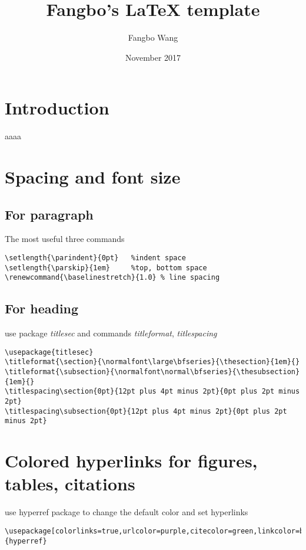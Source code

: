 \documentclass[12pt]{article}
\title{Fangbo's \LaTeX{} template}
\author{Fangbo Wang \\   }
\date{November 2017}
\renewcommand{\baselinestretch}{1.0} %
\begin{document}
\maketitle
\tableofcontents

\newpage
\section{Introduction}
aaaa
\section{Spacing and font size}

\subsection{For paragraph}
The most useful three commands
\begin{lstlisting}
\setlength{\parindent}{0pt}   %indent space
\setlength{\parskip}{1em}     %top, bottom space
\renewcommand{\baselinestretch}{1.0} % line spacing
\end{lstlisting}

\subsection{For heading}
use package \textit{titlesec} and commands \textit{titleformat}, \textit{titlespacing}
\begin{lstlisting}
\usepackage{titlesec}
\titleformat{\section}{\normalfont\large\bfseries}{\thesection}{1em}{}
\titleformat{\subsection}{\normalfont\normal\bfseries}{\thesubsection}{1em}{}
\titlespacing\section{0pt}{12pt plus 4pt minus 2pt}{0pt plus 2pt minus 2pt}
\titlespacing\subsection{0pt}{12pt plus 4pt minus 2pt}{0pt plus 2pt minus 2pt}
\end{lstlisting}


\section{Colored hyperlinks for figures, tables, citations}
use hyperref package to change the default color and set hyperlinks
\begin{lstlisting}
\usepackage[colorlinks=true,urlcolor=purple,citecolor=green,linkcolor=blue]{hyperref}
\end{lstlisting}
\end{document}
